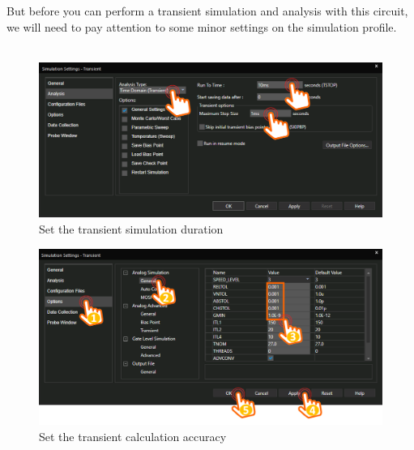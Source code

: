 But before you can perform a transient simulation and analysis with this circuit, we will need to pay attention to some minor settings on the simulation profile.\\
\\
\begin{figure}[H]
    \centering
    \includegraphics[width=\linewidth]{source/picture/bai_2/lab2_ex10_simProf1.png}
    \caption{Set the transient simulation duration}
    \label{lab2_ex10_simProf1}
\end{figure}

\begin{figure}[H]
    \centering
    \includegraphics[width=\linewidth]{source/picture/bai_2/lab2_ex10_simProf2.png}
    \caption{Set the transient calculation accuracy}
    \label{lab2_ex10_simProf2}
\end{figure}

